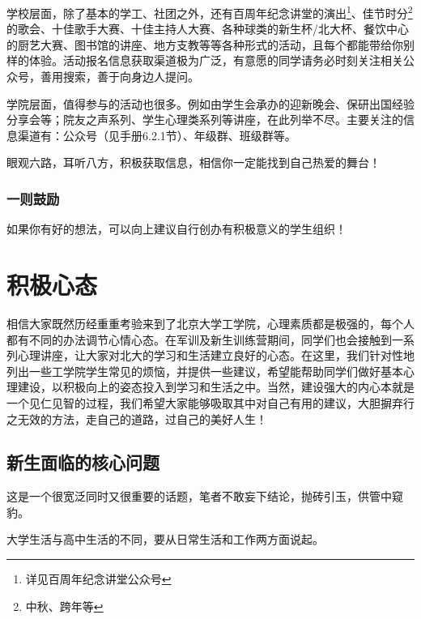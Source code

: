 \documentclass[11pt,oneside]{book}
\begin{document}
\vspace{10pt}

学校层面，除了基本的学工、社团之外，还有百周年纪念讲堂的演出\footnote{详见百周年纪念讲堂公众号}、佳节时分\footnote{中秋、跨年等}的歌会、十佳歌手大赛、十佳主持人大赛、各种球类的新生杯/北大杯、餐饮中心的厨艺大赛、图书馆的讲座、地方支教等等各种形式的活动，且每个都能带给你别样的体验。活动报名信息获取渠道极为广泛，有意愿的同学请务必时刻关注相关公众号，善用搜索，善于向身边人提问。

\vspace{10pt}

学院层面，值得参与的活动也很多。例如由学生会承办的迎新晚会、保研出国经验分享会等；院友之声系列、学生心理类系列等讲座，在此列举不尽。主要关注的信息渠道有：公众号（见手册6.2.1节）、年级群、班级群等。

\vspace{10pt}

眼观六路，耳听八方，积极获取信息，相信你一定能找到自己热爱的舞台！

\subsection{一则鼓励}
如果你有好的想法，可以向上建议自行创办有积极意义的学生组织！

\chapter{积极心态}
相信大家既然历经重重考验来到了北京大学工学院，心理素质都是极强的，每个人都有不同的办法调节心情心态。在军训及新生训练营期间，同学们也会接触到一系列心理讲座，让大家对北大的学习和生活建立良好的心态。在这里，我们针对性地列出一些工学院学生常见的烦恼，并提供一些建议，希望能帮助同学们做好基本心理建设，以积极向上的姿态投入到学习和生活之中。当然，建设强大的内心本就是一个见仁见智的过程，我们希望大家能够吸取其中对自己有用的建议，大胆摒弃行之无效的方法，走自己的道路，过自己的美好人生！

\section{新生面临的核心问题}
这是一个很宽泛同时又很重要的话题，笔者不敢妄下结论，抛砖引玉，供管中窥豹。

\vspace{10pt}

大学生活与高中生活的不同，要从日常生活和工作两方面说起。

\vspace{10pt}
\end{document}
